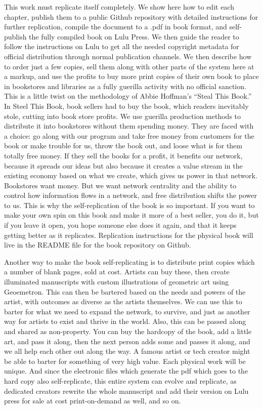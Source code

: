 This work must replicate itself completely.  We show here how to edit each chapter, publish them to a public Github repository with detailed instructions for further replication, compile the document to a .pdf in book format, and self-publish the fully compiled book on Lulu Press. We then guide the reader to follow the instructions on Lulu to get all the needed copyright metadata for official distribution through normal publication channels.  We then describe how to order just a few copies, sell them along with other parts of the system here at a markup, and use the profits to buy more print copies of their own book to place in bookstores and libraries as a fully guerilla activity with no official sanction.  This is a little twist on the methodology of Abbie Hoffman's ``Steal This Book.''  In Steel This Book, book sellers had to buy the book, which readers inevitably stole, cutting into book store profits.  We use guerilla production methods to distribute it into bookstores without them spending money.  They are faced with a choice: go along with our program and take free money from customers for the book or make trouble for us, throw the book out, and loose what is for them totally free money.  If they sell the books for a profit, it benefits our network, because it spreads our ideas but also because it creates a value stream in the existing economy based on what we create, which gives us power in that network.   Bookstores want money.  But we want network centrality and the ability to control how information flows in a network, and free distribution shifts the power to us.  This is why the self-replication of the book is so important.  If you want to make your own spin on this book and make it more of a best seller, you do it, but if you leave it open, you hope someone else does it again, and that it keeps getting better as it replicates.  Replication instructions for the physical book will live in the README file for the book repository on Github.

Another way to make the book self-replicating is to distribute print copies which a number of blank pages, sold at cost.  Artists can buy these, then create illuminated manuscripts with custom illustrations of geometric art using Geoemetron.  This can then be bartered based on the needs and powers of the artist, with outcomes as diverse as the artists themselves.  We can use this to barter for what we need to expand the network, to survive, and just as another way for artists to exist and thrive in the world.  Also, this can be passed along and shared as non-property.  You can buy the hardcopy of the book, add a little art, and pass it along, then the next person adds some and passes it along, and we all help each other out along the way.  A famous artist or tech creator might be able to barter for something of very high value.  Each physical work will be unique.  And since the electronic files which generate the pdf which goes to the hard copy also self-replicate, this entire system can evolve and replicate, as dedicated creators rewrite the whole manuscript and add their version on Lulu press for sale at cost print-on-demand as well, and so on.